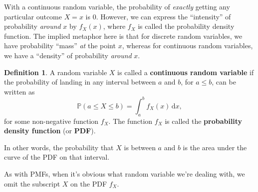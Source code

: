 \documentclass[
  a4paper,
]{book}
\theoremstyle{definition}
\newtheorem{definition}{Definition}[chapter]
\theoremstyle{definition}
\theoremstyle{definition}
\theoremstyle{definition}
\theoremstyle{remark}
\begin{document}
With a continuous random variable, the probability of \emph{exactly} getting any particular outcome \(X = x\) is 0. However, we can express the ``intensity'' of probability \emph{around} \(x\) by \(f_X(x)\), where \(f_X\) is called the probability density function. The implied metaphor here is that for discrete random variables, we have probability ``mass'' \emph{at} the point \(x\), whereas for continuous random variables, we have a ``density'' of probability \emph{around} \(x\).

\begin{definition}
A random variable \(X\) is called a \textbf{continuous random variable} if the probability of landing in any interval between \(a\) and \(b\), for \(a \leq b\), can be written as
\[ \mathbb P(a \leq X \leq b) = \int_a^b f_X(x) \, \mathrm{d}x , \]
for some non-negative function \(f_X\). The function \(f_X\) is called the \textbf{probability density function} (or \textbf{PDF}).
\end{definition}

In other words, the probability that \(X\) is between \(a\) and \(b\) is the area under the curve of the PDF on that interval.

As with PMFs, when it's obvious what random variable we're dealing with, we omit the subscript \(X\) on the PDF \(f_X\).
\end{document}
